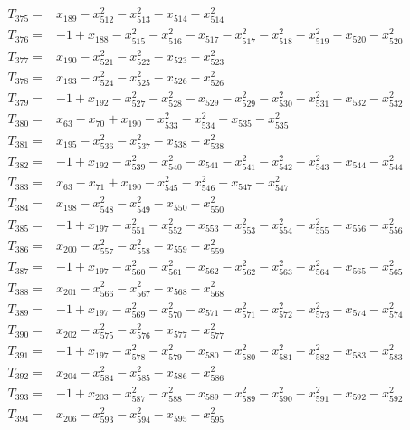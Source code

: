 \begin{align*}
T_{375}={}&x_{189}-x_{512}^{2}-x_{513}^{2}-x_{514}-x_{514}^{2}\\[3pt]
T_{376}={}&-1+x_{188}-x_{515}^{2}-x_{516}^{2}-x_{517}-x_{517}^{2}-x_{518}^{2}-x_{519}^{2}-x_{520}-x_{520}^{2}\\[3pt]
T_{377}={}&x_{190}-x_{521}^{2}-x_{522}^{2}-x_{523}-x_{523}^{2}\\[3pt]
T_{378}={}&x_{193}-x_{524}^{2}-x_{525}^{2}-x_{526}-x_{526}^{2}\\[3pt]
T_{379}={}&-1+x_{192}-x_{527}^{2}-x_{528}^{2}-x_{529}-x_{529}^{2}-x_{530}^{2}-x_{531}^{2}-x_{532}-x_{532}^{2}\\[3pt]
T_{380}={}&x_{63}-x_{70}+x_{190}-x_{533}^{2}-x_{534}^{2}-x_{535}-x_{535}^{2}\\[3pt]
T_{381}={}&x_{195}-x_{536}^{2}-x_{537}^{2}-x_{538}-x_{538}^{2}\\[3pt]
T_{382}={}&-1+x_{192}-x_{539}^{2}-x_{540}^{2}-x_{541}-x_{541}^{2}-x_{542}^{2}-x_{543}^{2}-x_{544}-x_{544}^{2}\\[3pt]
T_{383}={}&x_{63}-x_{71}+x_{190}-x_{545}^{2}-x_{546}^{2}-x_{547}-x_{547}^{2}\\[3pt]
T_{384}={}&x_{198}-x_{548}^{2}-x_{549}^{2}-x_{550}-x_{550}^{2}\\[3pt]
T_{385}={}&-1+x_{197}-x_{551}^{2}-x_{552}^{2}-x_{553}-x_{553}^{2}-x_{554}^{2}-x_{555}^{2}-x_{556}-x_{556}^{2}\\[3pt]
T_{386}={}&x_{200}-x_{557}^{2}-x_{558}^{2}-x_{559}-x_{559}^{2}\\[3pt]
T_{387}={}&-1+x_{197}-x_{560}^{2}-x_{561}^{2}-x_{562}-x_{562}^{2}-x_{563}^{2}-x_{564}^{2}-x_{565}-x_{565}^{2}\\[3pt]
T_{388}={}&x_{201}-x_{566}^{2}-x_{567}^{2}-x_{568}-x_{568}^{2}\\[3pt]
T_{389}={}&-1+x_{197}-x_{569}^{2}-x_{570}^{2}-x_{571}-x_{571}^{2}-x_{572}^{2}-x_{573}^{2}-x_{574}-x_{574}^{2}\\[3pt]
T_{390}={}&x_{202}-x_{575}^{2}-x_{576}^{2}-x_{577}-x_{577}^{2}\\[3pt]
T_{391}={}&-1+x_{197}-x_{578}^{2}-x_{579}^{2}-x_{580}-x_{580}^{2}-x_{581}^{2}-x_{582}^{2}-x_{583}-x_{583}^{2}\\[3pt]
T_{392}={}&x_{204}-x_{584}^{2}-x_{585}^{2}-x_{586}-x_{586}^{2}\\[3pt]
T_{393}={}&-1+x_{203}-x_{587}^{2}-x_{588}^{2}-x_{589}-x_{589}^{2}-x_{590}^{2}-x_{591}^{2}-x_{592}-x_{592}^{2}\\[3pt]
T_{394}={}&x_{206}-x_{593}^{2}-x_{594}^{2}-x_{595}-x_{595}^{2}\\[3pt]

\end{align*}

